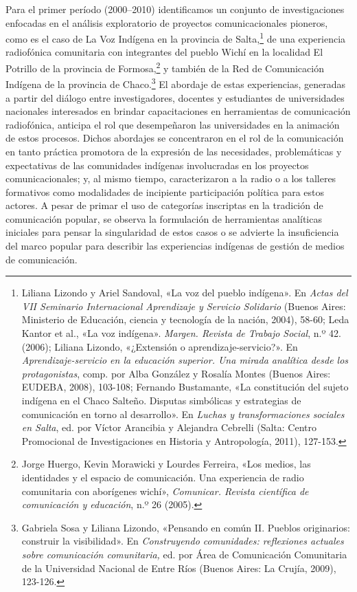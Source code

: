 \documentclass{tufte-handout}
\begin{document}
Para el primer período (2000--2010) identificamos un conjunto de
investigaciones enfocadas en el análisis exploratorio de proyectos
comunicacionales pioneros, como es el caso de La Voz Indígena en la
provincia de Salta,\footnote{Liliana Lizondo y Ariel Sandoval, «La voz
  del pueblo indígena». En \emph{Actas del VII Seminario Internacional
  Aprendizaje y Servicio Solidario} (Buenos Aires: Ministerio de
  Educación, ciencia y tecnología de la nación, 2004), 58-60; Leda
  Kantor et al., «La voz indígena». \emph{Margen. Revista de Trabajo
  Social}, n.º 42. (2006); Liliana Lizondo, «¿Extensión o
  aprendizaje-servicio?». En \emph{Aprendizaje-servicio en la educación
  superior. Una mirada analítica desde los protagonistas}, comp. por
  Alba González y Rosalía Montes (Buenos Aires: EUDEBA, 2008), 103-108;
  Fernando Bustamante, «La constitución del sujeto indígena en el Chaco
  Salteño. Disputas simbólicas y estrategias de comunicación en torno al
  desarrollo». En \emph{Luchas y transformaciones sociales en Salta},
  ed. por Víctor Arancibia y Alejandra Cebrelli (Salta: Centro
  Promocional de Investigaciones en Historia y Antropología, 2011),
  127-153.} de una experiencia radiofónica comunitaria con integrantes
del pueblo Wichí en la localidad El Potrillo de la provincia de
Formosa,\footnote{Jorge Huergo, Kevin Morawicki y Lourdes Ferreira, «Los
  medios, las identidades y el espacio de comunicación. Una experiencia
  de radio comunitaria con aborígenes wichí», \emph{Comunicar. Revista
  científica de comunicación y educación}, n.º 26 (2005).} y también de
la Red de Comunicación Indígena de la provincia de Chaco.\footnote{Gabriela
  Sosa y Liliana Lizondo, «Pensando en común II. Pueblos originarios:
  construir la visibilidad». En \emph{Construyendo comunidades:
  reflexiones actuales sobre comunicación comunitaria,} ed. por Área de
  Comunicación Comunitaria de la Universidad Nacional de Entre Ríos
  (Buenos Aires: La Crujía, 2009), 123-126.} El abordaje de estas
experiencias, generadas a partir del diálogo entre investigadores,
docentes y estudiantes de universidades nacionales interesados en
brindar capacitaciones en herramientas de comunicación radiofónica,
anticipa el rol que desempeñaron las universidades en la animación de
estos procesos. Dichos abordajes se concentraron en el rol de la
comunicación en tanto práctica promotora de la expresión de las
necesidades, problemáticas y expectativas de las comunidades indígenas
involucradas en los proyectos comunicacionales; y, al mismo tiempo,
caracterizaron a la radio o a los talleres formativos como modalidades
de incipiente participación política para estos actores. A pesar de
primar el uso de categorías inscriptas en la tradición de comunicación
popular, se observa la formulación de herramientas analíticas iniciales
para pensar la singularidad de estos casos o se advierte la
insuficiencia del marco popular para describir las experiencias
indígenas de gestión de medios de comunicación.
\end{document}
